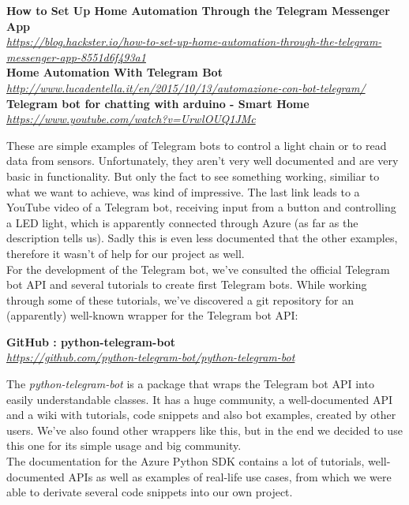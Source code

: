 \documentclass[a4paper]{article}
\begin{document}
	\begin{center}
		\textbf{How to Set Up Home Automation Through the Telegram Messenger App}\\
		\textit{\href{https://blog.hackster.io/how-to-set-up-home-automation-through-the-telegram-messenger-app-8551d6f493a1}
			{https://blog.hackster.io/how-to-set-up-home-automation-through-the-telegram-messenger-app-8551d6f493a1}}\\
		\textbf{Home Automation With Telegram Bot}\\
		\textit{\href{http://www.lucadentella.it/en/2015/10/13/automazione-con-bot-telegram/}
			{http://www.lucadentella.it/en/2015/10/13/automazione-con-bot-telegram/}}\\
		\textbf{Telegram bot for chatting with arduino - Smart Home}\\
		\textit{\href{https://www.youtube.com/watch?v=UrwlOUQ1JMc}{https://www.youtube.com/watch?v=UrwlOUQ1JMc}}
	\end{center}
	\noindent
	These are simple examples of Telegram bots to control a light chain or to read data from sensors. 
	Unfortunately, they aren't very well documented and are very basic in functionality. 
	But only the fact to see something working, similiar to what we want to achieve, was kind of impressive. 
	The last link leads to a YouTube video of a Telegram bot, receiving input from a button and controlling a LED light, which is apparently connected through Azure (as far as the description tells us). 
	Sadly this is even less documented that the other examples, therefore it wasn't of help for our project as well.\\
	For the development of the Telegram bot, we've consulted the official Telegram bot API and several tutorials to create first Telegram bots. 
	While working through some of these tutorials, we've discovered a git repository for an (apparently) well-known wrapper for the Telegram bot API:
	\begin{center}
		\textbf{GitHub : python-telegram-bot}\\
		\textit{\href{https://github.com/python-telegram-bot/python-telegram-bot}{https://github.com/python-telegram-bot/python-telegram-bot}}
	\end{center}
	The \textit{python-telegram-bot} is a package that wraps the Telegram bot API into easily understandable classes. 
	It has a huge community, a well-documented API and a wiki with tutorials, code snippets and also bot examples, created by other users. 
	We've also found other wrappers like this, but in the end we decided to use this one for its simple usage and big community.\\
	The documentation for the Azure Python SDK contains a lot of tutorials, well-documented APIs as well as examples of real-life use cases, from which we were able to derivate several code snippets into our own project.
	
\end{document}
